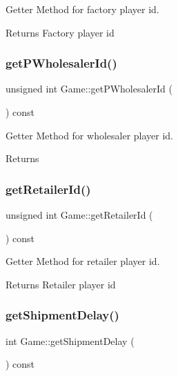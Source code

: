 Getter Method for factory player id. 

\begin{DoxyReturn}{Returns}
Factory player id 
\end{DoxyReturn}
\mbox{\label{classGame_a8197219d0ce49f5ac76d1ed6890cfb3e}} 
\subsubsection{\texorpdfstring{get\+P\+Wholesaler\+Id()}{getPWholesalerId()}}
{\footnotesize\ttfamily unsigned int Game\+::get\+P\+Wholesaler\+Id (\begin{DoxyParamCaption}{ }\end{DoxyParamCaption}) const}



Getter Method for wholesaler player id. 

\begin{DoxyReturn}{Returns}

\end{DoxyReturn}
\mbox{\label{classGame_a22a98a8e7701f22e9bf5c1c011724154}} 
\subsubsection{\texorpdfstring{get\+Retailer\+Id()}{getRetailerId()}}
{\footnotesize\ttfamily unsigned int Game\+::get\+Retailer\+Id (\begin{DoxyParamCaption}{ }\end{DoxyParamCaption}) const}



Getter Method for retailer player id. 

\begin{DoxyReturn}{Returns}
Retailer player id 
\end{DoxyReturn}
\mbox{\label{classGame_ab25852cc4c2df47382d33cfe3c2b55d0}} 
\subsubsection{\texorpdfstring{get\+Shipment\+Delay()}{getShipmentDelay()}}
{\footnotesize\ttfamily int Game\+::get\+Shipment\+Delay (\begin{DoxyParamCaption}{ }\end{DoxyParamCaption}) const}



